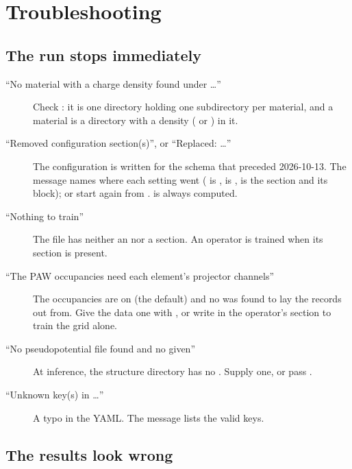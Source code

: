 \chapter{Troubleshooting}
\label{ch:troubleshooting}

\section{The run stops immediately}

\begin{description}
  \item[``No material with a charge density found under \ldots''] Check : it is one
    directory holding one subdirectory per material, and a material is a
    directory with a density ( or ) in it.
  \item[``Removed configuration section(s)'', or ``Replaced: \ldots''] The
    configuration is written for the schema that preceded 2026-10-13. The
    message names where each setting went
    ( is ,
     is ,  is the
     section and its  block); or start again from
    .  is always computed.
  \item[``Nothing to train''] The file has neither an  nor a
     section. An operator is trained when its section is
    present.
  \item[``The PAW occupancies need each element's projector channels''] The
    occupancies are on (the default) and no  was found to lay the
    records out from. Give the data one with , or write
     in the operator's section to train the grid alone.
  \item[``No pseudopotential file found and no  given''] At
    inference, the structure directory has no . Supply one, or pass
    .
  \item[``Unknown key(s) in \ldots''] A typo in the YAML. The message lists
    the valid keys.
\end{description}

\section{The results look wrong}


